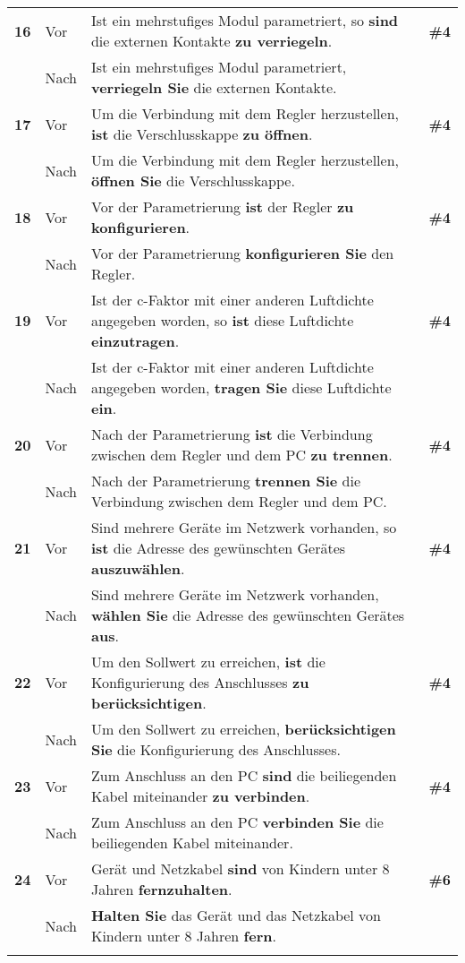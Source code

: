\begin{longtable}{llp{}l}
\tablevspace
{ \textbf{16}} & Vor & Ist ein mehrstufiges Modul parametriert, so \textbf{sind} die externen Kontakte \textbf{zu verriegeln}. & \textbf{\#4}\\
& Nach & Ist ein mehrstufiges Modul parametriert, \textbf{verriegeln Sie} die externen Kontakte. & \\
\tablevspace
{ \textbf{17}} & Vor & Um die Verbindung mit dem Regler herzustellen, \textbf{ist} die Verschlusskappe \textbf{zu öffnen}. & \textbf{\#4}\\
& Nach & Um die Verbindung mit dem Regler herzustellen, \textbf{öffnen Sie} die Verschlusskappe. & \\
\tablevspace
{ \textbf{18}} & Vor & Vor der Parametrierung \textbf{ist} der Regler \textbf{zu konfigurieren}. & \textbf{\#4}\\
& Nach & Vor der Parametrierung \textbf{konfigurieren Sie} den Regler. & \\
\tablevspace
{ \textbf{19}} & Vor & Ist der c-Faktor mit einer anderen Luftdichte angegeben worden, so \textbf{ist} diese Luftdichte \textbf{einzutragen}. & \textbf{\#4}\\
& Nach & Ist der c-Faktor mit einer anderen Luftdichte angegeben worden, \textbf{tragen Sie} diese Luftdichte \textbf{ein}. & \\
\tablevspace
{ \textbf{20}} & Vor & Nach der Parametrierung \textbf{ist} die Verbindung zwischen dem Regler und dem PC \textbf{zu trennen}. & \textbf{\#4}\\
& Nach & Nach der Parametrierung \textbf{trennen Sie} die Verbindung zwischen dem Regler und dem PC. & \\
\tablevspace
{ \textbf{21}} & Vor & Sind mehrere Geräte im Netzwerk vorhanden, so \textbf{ist} die Adresse des gewünschten Gerätes \textbf{auszuwählen}. & \textbf{\#4}\\
& Nach & Sind mehrere Geräte im Netzwerk vorhanden, \textbf{wählen Sie} die Adresse des gewünschten Gerätes \textbf{aus}. & \\
\tablevspace
{ \textbf{22}} & Vor & Um den Sollwert zu erreichen, \textbf{ist} die Konfigurierung des Anschlusses \textbf{zu berücksichtigen}. & \textbf{\#4}\\
& Nach & Um den Sollwert zu erreichen, \textbf{berücksichtigen Sie} die Konfigurierung des Anschlusses. & \\
\tablevspace
{ \textbf{23}} & Vor & Zum Anschluss an den PC \textbf{sind} die beiliegenden Kabel miteinander \textbf{zu verbinden}. & \textbf{\#4}\\
& Nach & Zum Anschluss an den PC \textbf{verbinden Sie} die beiliegenden Kabel miteinander. & \\
\tablevspace
{ \textbf{24}} & Vor & Gerät und Netzkabel \textbf{sind} von Kindern unter 8 Jahren \textbf{fernzuhalten}. & \textbf{\#6}\\
& Nach & \textbf{Halten Sie} das Gerät und das Netzkabel von Kindern unter 8 Jahren \textbf{fern}. & \\
\lspbottomrule
\end{longtable}



